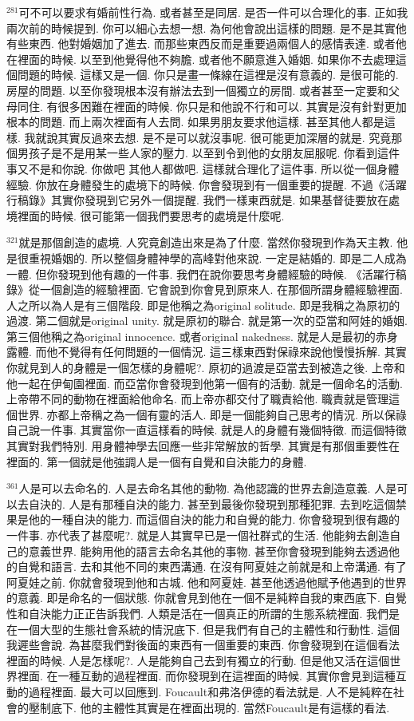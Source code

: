 \documentclass{book}
\begin{document}
$^{281}$可不可以要求有婚前性行為.
或者甚至是同居.
是否一件可以合理化的事.
正如我兩次前的時候提到.
你可以細心去想一想.
為何他會說出這樣的問題.
是不是其實他有些東西.
他對婚姻加了進去.
而那些東西反而是重要過兩個人的感情表達.
或者他在裡面的時候.
以至到他覺得他不夠膽.
或者他不願意進入婚姻.
如果你不去處理這個問題的時候.
這樣又是一個.
你只是畫一條線在這裡是沒有意義的.
是很可能的.
房屋的問題.
以至你發現根本沒有辦法去到一個獨立的房間.
或者甚至一定要和父母同住.
有很多困難在裡面的時候.
你只是和他說不行和可以.
其實是沒有針對更加根本的問題.
而上兩次裡面有人去問.
如果男朋友要求他這樣.
甚至其他人都是這樣.
我就說其實反過來去想.
是不是可以就沒事呢.
很可能更加深層的就是.
究竟那個男孩子是不是用某一些人家的壓力.
以至到令到他的女朋友屈服呢.
你看到這件事又不是和你說.
你做吧 其他人都做吧.
這樣就合理化了這件事.
所以從一個身體經驗.
你放在身體發生的處境下的時候.
你會發現到有一個重要的提醒.
不過《活躍行稿錄》其實你發現到它另外一個提醒.
我們一樣東西就是.
如果基督徒要放在處境裡面的時候.
很可能第一個我們要思考的處境是什麼呢.

$^{321}$就是那個創造的處境.
人究竟創造出來是為了什麼.
當然你發現到作為天主教.
他是很重視婚姻的.
所以整個身體神學的高峰對他來說.
一定是結婚的.
即是二人成為一體.
但你發現到他有趣的一件事.
我們在說你要思考身體經驗的時候.
《活躍行稿錄》從一個創造的經驗裡面.
它會說到你會見到原來人.
在那個所謂身體經驗裡面.
人之所以為人是有三個階段.
即是他稱之為original solitude.
即是我稱之為原初的過渡.
第二個就是original unity.
就是原初的聯合.
就是第一次的亞當和阿娃的婚姻.
第三個他稱之為original innocence.
或者original nakedness.
就是人是最初的赤身露體.
而他不覺得有任何問題的一個情況.
這三樣東西對保祿來說他慢慢拆解.
其實你就見到人的身體是一個怎樣的身體呢?.
原初的過渡是亞當去到被造之後.
上帝和他一起在伊甸園裡面.
而亞當你會發現到他第一個有的活動.
就是一個命名的活動.
上帝帶不同的動物在裡面給他命名.
而上帝亦都交付了職責給他.
職責就是管理這個世界.
亦都上帝稱之為一個有靈的活人.
即是一個能夠自己思考的情況.
所以保祿自己說一件事.
其實當你一直這樣看的時候.
就是人的身體有幾個特徵.
而這個特徵其實對我們特別.
用身體神學去回應一些非常解放的哲學.
其實是有那個重要性在裡面的.
第一個就是他強調人是一個有自覺和自決能力的身體.

$^{361}$人是可以去命名的.
人是去命名其他的動物.
為他認識的世界去創造意義.
人是可以去自決的.
人是有那種自決的能力.
甚至到最後你發現到那種犯罪.
去到吃這個禁果是他的一種自決的能力.
而這個自決的能力和自覺的能力.
你會發現到很有趣的一件事.
亦代表了甚麼呢?.
就是人其實早已是一個社群式的生活.
他能夠去創造自己的意義世界.
能夠用他的語言去命名其他的事物.
甚至你會發現到能夠去透過他的自覺和語言.
去和其他不同的東西溝通.
在沒有阿夏娃之前就是和上帝溝通.
有了阿夏娃之前.
你就會發現到他和古城.
他和阿夏娃.
甚至他透過他賦予他遇到的世界的意義.
即是命名的一個狀態.
你就會見到他在一個不是純粹自我的東西底下.
自覺性和自決能力正正告訴我們.
人類是活在一個真正的所謂的生態系統裡面.
我們是在一個大型的生態社會系統的情況底下.
但是我們有自己的主體性和行動性.
這個我遲些會說.
為甚麼我們對後面的東西有一個重要的東西.
你會發現到在這個看法裡面的時候.
人是怎樣呢?.
人是能夠自己去到有獨立的行動.
但是他又活在這個世界裡面.
在一種互動的過程裡面.
而你發現到在這裡面的時候.
其實你會見到這種互動的過程裡面.
最大可以回應到.
Foucault和弗洛伊德的看法就是.
人不是純粹在社會的壓制底下.
他的主體性其實是在裡面出現的.
當然Foucault是有這樣的看法.
\end{document}
